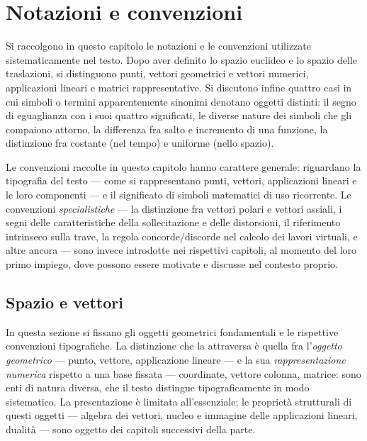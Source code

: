 \graphicspath{{Parti/P01-Preliminari/A01-Notazioni-Convenzioni/Figure/}}
\chapter{Notazioni e convenzioni}\label{app:notazioni}

\begin{sommario}
	Si raccolgono in questo capitolo le notazioni e le convenzioni
	utilizzate sistematicamente nel testo. Dopo aver definito lo 
	spazio euclideo e lo spazio delle traslazioni, si distinguono 
	punti, vettori geometrici e vettori numerici, applicazioni 
	lineari e matrici rappresentative. 
	Si discutono infine quattro casi in cui simboli o termini 
	apparentemente sinonimi denotano oggetti distinti: il segno 
	di eguaglianza con i suoi quattro significati, le diverse 
	nature dei simboli che gli compaiono attorno, la differenza 
	fra salto e incremento di una funzione, la distinzione fra 
	costante (nel tempo) e uniforme (nello spazio).
\end{sommario}

Le convenzioni raccolte in questo capitolo hanno carattere generale: 
riguardano la tipografia del testo --- come si rappresentano punti, 
vettori, applicazioni lineari e le loro componenti --- e il 
significato di simboli matematici di uso ricorrente. Le convenzioni 
\emph{specialistiche} --- la distinzione fra vettori polari e 
vettori assiali, i segni delle caratteristiche della sollecitazione 
e delle distorsioni, il riferimento intrinseco sulla trave, la regola 
concorde/discorde nel calcolo dei lavori virtuali, e altre ancora 
--- sono invece introdotte nei rispettivi capitoli, al momento del 
loro primo impiego, dove possono essere motivate e discusse nel 
contesto proprio.

\section{Spazio e vettori}\label{sec:spazio_vettori}

In questa sezione si fissano gli oggetti geometrici fondamentali e 
le rispettive convenzioni tipografiche. La distinzione che la 
attraversa è quella fra l'\emph{oggetto geometrico} --- punto, 
vettore, applicazione lineare --- e la sua \emph{rappresentazione 
	numerica} rispetto a una base fissata --- coordinate, vettore 
colonna, matrice: sono enti di natura diversa, che il testo 
distingue tipograficamente in modo sistematico. La presentazione 
è limitata all'essenziale; le proprietà strutturali di questi 
oggetti --- algebra dei vettori, nucleo e immagine delle 
applicazioni lineari, dualità --- sono oggetto dei capitoli 
successivi della parte.


